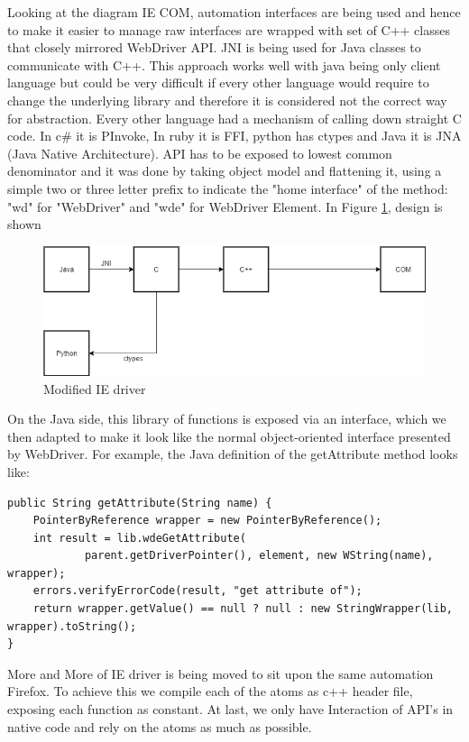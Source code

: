 \documentclass[article,type=msc,colorback,accentcolor=tud9c,twoside,11pt]{tudthesis}
\begin{document}
Looking at the diagram IE COM, automation interfaces are being used and hence to make it easier to manage raw interfaces are wrapped with set of C++ classes that closely mirrored WebDriver API. JNI is being used for Java classes to communicate with C++. This approach works well with java being only client language but could be very difficult if every other language would require to change the underlying library and therefore it is considered not the correct way for abstraction. Every other language had a mechanism of calling down straight C code. In c\# it is PInvoke, In ruby it is FFI, python has ctypes and Java it is JNA (Java Native Architecture). API has to be exposed to lowest common denominator and it was done by taking object model and flattening it, using a simple two or three letter prefix to indicate the "home interface" of the method: "wd" for "WebDriver" and "wde" for WebDriver Element. In Figure 
\ref{fig:ModifiedIEdriver}, design is shown 
\begin{figure}[h]
	\centering
	\includegraphics[scale=0.6]{ModifiedIEdriver.PNG}
	\caption{Modified IE driver}
	\label{fig:ModifiedIEdriver}
\end{figure}
On the Java side, this library of functions is exposed via an interface, which we then adapted to make it look like the normal object-oriented interface presented by WebDriver. For example, the Java definition of the getAttribute method looks like:

\begin{lstlisting}
public String getAttribute(String name) {
	PointerByReference wrapper = new PointerByReference();
	int result = lib.wdeGetAttribute(
			parent.getDriverPointer(), element, new WString(name), wrapper);
	errors.verifyErrorCode(result, "get attribute of");
	return wrapper.getValue() == null ? null : new StringWrapper(lib, wrapper).toString();
}
\end{lstlisting}

More and More of IE driver is being moved to sit upon the same automation Firefox. To achieve this we compile each of the atoms as c++ header file, exposing each function as constant. At last, we only have Interaction of API's in native code and rely on the atoms as much as possible.
\end{document}
